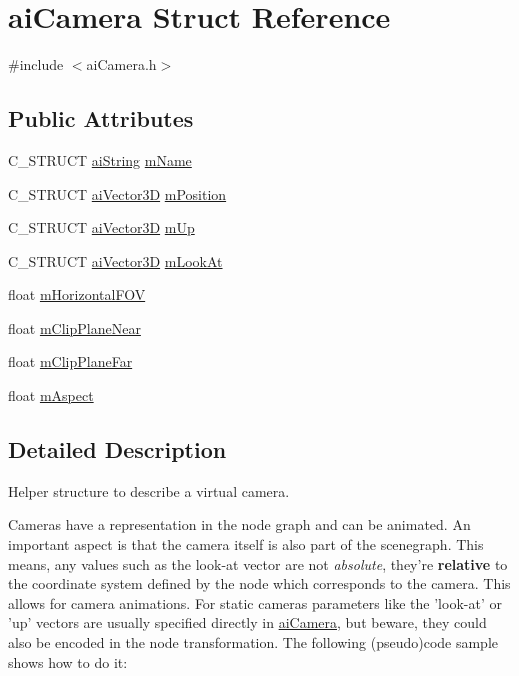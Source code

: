 \hypertarget{structai_camera}{\section{ai\-Camera Struct Reference}
\label{structai_camera}
}


{\ttfamily \#include $<$ai\-Camera.\-h$>$}

\subsection*{Public Attributes}
\begin{DoxyCompactItemize}
\item 
C\-\_\-\-S\-T\-R\-U\-C\-T \hyperlink{structai_string}{ai\-String} \hyperlink{structai_camera_aa6a5fe5e04b3db1b23f69eb9910c6816}{m\-Name}
\item 
C\-\_\-\-S\-T\-R\-U\-C\-T \hyperlink{structai_vector3_d}{ai\-Vector3\-D} \hyperlink{structai_camera_a518617ea192ca0698e748a4399e7c3a5}{m\-Position}
\item 
C\-\_\-\-S\-T\-R\-U\-C\-T \hyperlink{structai_vector3_d}{ai\-Vector3\-D} \hyperlink{structai_camera_a7fb42b287389b4f99c883098268d6d1a}{m\-Up}
\item 
C\-\_\-\-S\-T\-R\-U\-C\-T \hyperlink{structai_vector3_d}{ai\-Vector3\-D} \hyperlink{structai_camera_af9463249ac870e030fa435b1186cef23}{m\-Look\-At}
\item 
float \hyperlink{structai_camera_adcdea73ece19ea0a9068f5544ec23592}{m\-Horizontal\-F\-O\-V}
\item 
float \hyperlink{structai_camera_a720e8c94c036dcefe4b13cc1c69c521e}{m\-Clip\-Plane\-Near}
\item 
float \hyperlink{structai_camera_aa9ccf77e3d7ca3dc8f46df931b65172f}{m\-Clip\-Plane\-Far}
\item 
float \hyperlink{structai_camera_ae414556eaa6f910b5927f465d97bf70c}{m\-Aspect}
\end{DoxyCompactItemize}


\subsection{Detailed Description}
Helper structure to describe a virtual camera.

Cameras have a representation in the node graph and can be animated. An important aspect is that the camera itself is also part of the scenegraph. This means, any values such as the look-\/at vector are not {\itshape absolute}, they're {\bfseries relative} to the coordinate system defined by the node which corresponds to the camera. This allows for camera animations. For static cameras parameters like the 'look-\/at' or 'up' vectors are usually specified directly in \hyperlink{structai_camera}{ai\-Camera}, but beware, they could also be encoded in the node transformation. The following (pseudo)code sample shows how to do it\-: \par
\par
 
